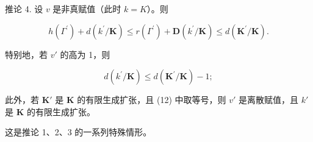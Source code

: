 推论 4. 设 \(v\) 是非真赋值（此时 \(k = K\)）。则

\[
h (\Gamma^ {\prime}) + d (k ^ {\prime} / \mathbf {K}) \leqslant r (\Gamma^ {\prime}) + \mathbf {D} (k ^ {\prime} / \mathbf {K}) \leqslant d (\mathbf {K} ^ {\prime} / \mathbf {K}).\tag{11}
\]

特别地，若 \(v'\) 的高为 1，则

\[
d (k ^ {\prime} / \mathbf {K}) \leqslant d (\mathbf {K} ^ {\prime} / \mathbf {K}) - 1;\tag{12}
\]

此外，若 \(\mathbf{K}'\) 是 \(\mathbf{K}\) 的有限生成扩张，且 (12) 中取等号，则 \(v'\) 是离散赋值，且 \(k'\) 是 \(\mathbf{K}\) 的有限生成扩张。

这是推论 1、2、3 的一系列特殊情形。


